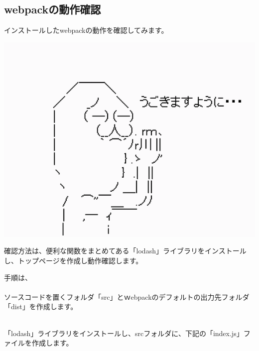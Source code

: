 \subsection{webpackの動作確認}
\keeplastskip{
  \label{sec:2-2-3}
  \label{04-webpack-check}
  \par\nobreak
}

インストールしたwebpackの動作を確認してみます。

\begin{reviewimage}[H]%
\includegraphics[width=0.6\maxwidth]{./images/02-create-react-app/pray.png}%
\label{image:02-create-react-app:pray}
\end{reviewimage}
\vspace*{\baselineskip}

確認方法は、便利な関数をまとめてある「lodash」ライブラリをインストールし、トップページを作成し動作確認します。

\vspace*{\baselineskip}

手順は、\\[0pt]
{}\\[0pt]
ソースコードを置くフォルダ「src」とｗebpackのデフォルトの出力先フォルダ「dist」を作成します。

\vspace*{\baselineskip}

{}\\[0pt]
「lodash」ライブラリをインストールし、srcフォルダに、下記の「index.js」ファイルを作成します。

